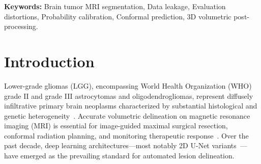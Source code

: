 \documentclass[11pt,a4paper]{article}
\begin{document}
\vspace{0.8em}
\noindent\textbf{Keywords:} Brain tumor MRI segmentation, Data leakage, Evaluation distortions, Probability calibration, Conformal prediction, 3D volumetric post-processing.

\vspace{1.5em}

\section{Introduction}
\label{sec:intro}

Lower-grade gliomas (LGG), encompassing World Health Organization (WHO) grade II and grade III astrocytomas and oligodendrogliomas, represent diffusely infiltrative primary brain neoplasms characterized by substantial histological and genetic heterogeneity~\cite{louis20212021,ceccarelli2016molecular}. Accurate volumetric delineation on magnetic resonance imaging (MRI) is essential for image-guided maximal surgical resection, conformal radiation planning, and monitoring therapeutic response~\cite{buda2019association}. Over the past decade, deep learning architectures---most notably 2D U-Net variants~\cite{ronneberger2015u,zhou2018unetplusplus,oktay2018attention}---have emerged as the prevailing standard for automated lesion delineation. 
\end{document}
